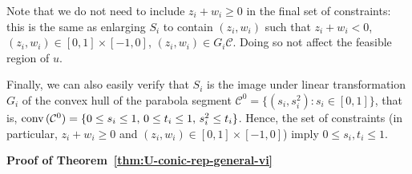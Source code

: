 	Note that we do not need to include $z_i + w_i \geq 0$ in the final set of constraints: this is the same as enlarging $S_i$ to contain $(z_i, w_i)$ such that $z_i + w_i < 0$, $(z_i, w_i)\in [0,1]\times [-1, 0]$, $(z_i, w_i) \in G_i \mathcal{C}$. Doing so not affect the feasible region of $u$.

	Finally, we can also easily verify that $S_i$ is the image under linear transformation $G_i$ of the convex hull of the parabola segment $\mathcal{C}^0 = \{ (s_i, s_i^2): s_i \in [0,1] \}$, that is, 
	$\textnormal{conv}\,(\mathcal{C}^0) = \{ 0\leq s_i \leq 1,\, 0 \leq t_i \leq 1,\, s_i^2 \leq t_i \}$.
	Hence, the set of constraints (in particular, $z_i + w_i \geq 0$ and $(z_i,w_i)\in [0,1] \times [-1,0]$) imply
	$0\leq s_i, t_i \leq 1$.

	\smallskip\noindent\textbf{Proof of Theorem~\ref{thm:U-conic-rep-general-vi}}

